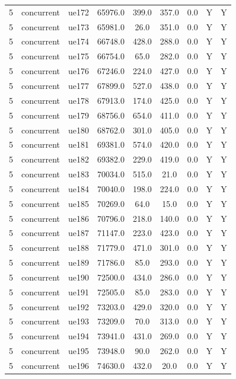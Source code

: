 \begin{table}[ht]
\begin{tabular}{|c|c|c|c|c|c|c|c|c|}
5 & concurrent & ue172 & 65976.0 & 399.0 & 357.0 & 0.0 & Y & Y \\
5 & concurrent & ue173 & 65981.0 & 26.0 & 351.0 & 0.0 & Y & Y \\
5 & concurrent & ue174 & 66748.0 & 428.0 & 288.0 & 0.0 & Y & Y \\
5 & concurrent & ue175 & 66754.0 & 65.0 & 282.0 & 0.0 & Y & Y \\
5 & concurrent & ue176 & 67246.0 & 224.0 & 427.0 & 0.0 & Y & Y \\
5 & concurrent & ue177 & 67899.0 & 527.0 & 438.0 & 0.0 & Y & Y \\
5 & concurrent & ue178 & 67913.0 & 174.0 & 425.0 & 0.0 & Y & Y \\
5 & concurrent & ue179 & 68756.0 & 654.0 & 411.0 & 0.0 & Y & Y \\
5 & concurrent & ue180 & 68762.0 & 301.0 & 405.0 & 0.0 & Y & Y \\
5 & concurrent & ue181 & 69381.0 & 574.0 & 420.0 & 0.0 & Y & Y \\
5 & concurrent & ue182 & 69382.0 & 229.0 & 419.0 & 0.0 & Y & Y \\
5 & concurrent & ue183 & 70034.0 & 515.0 & 21.0 & 0.0 & Y & Y \\
5 & concurrent & ue184 & 70040.0 & 198.0 & 224.0 & 0.0 & Y & Y \\
5 & concurrent & ue185 & 70269.0 & 64.0 & 15.0 & 0.0 & Y & Y \\
5 & concurrent & ue186 & 70796.0 & 218.0 & 140.0 & 0.0 & Y & Y \\
5 & concurrent & ue187 & 71147.0 & 223.0 & 423.0 & 0.0 & Y & Y \\
5 & concurrent & ue188 & 71779.0 & 471.0 & 301.0 & 0.0 & Y & Y \\
5 & concurrent & ue189 & 71786.0 & 85.0 & 293.0 & 0.0 & Y & Y \\
5 & concurrent & ue190 & 72500.0 & 434.0 & 286.0 & 0.0 & Y & Y \\
5 & concurrent & ue191 & 72505.0 & 85.0 & 283.0 & 0.0 & Y & Y \\
5 & concurrent & ue192 & 73203.0 & 429.0 & 320.0 & 0.0 & Y & Y \\
5 & concurrent & ue193 & 73209.0 & 70.0 & 313.0 & 0.0 & Y & Y \\
5 & concurrent & ue194 & 73941.0 & 431.0 & 269.0 & 0.0 & Y & Y \\
5 & concurrent & ue195 & 73948.0 & 90.0 & 262.0 & 0.0 & Y & Y \\
5 & concurrent & ue196 & 74630.0 & 432.0 & 20.0 & 0.0 & Y & Y \\

\end{tabular}
\end{table}
